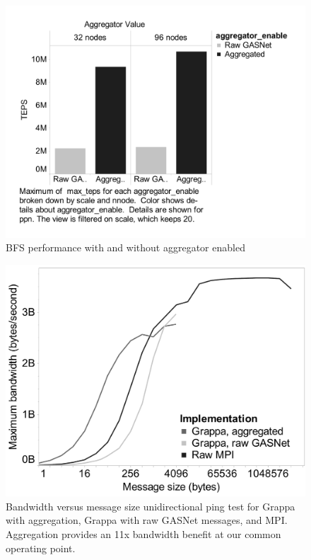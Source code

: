 \begin{figure}[htbH]
\begin{center}
  \includegraphics[width=0.95\columnwidth]{figs/bfs_aggregator_value}
\begin{minipage}{0.95\columnwidth}
  \caption{\label{fig:bfs-aggregator} BFS performance with and without aggregator enabled }
\end{minipage}
\vspace{-3ex}
\end{center}
\end{figure}




\begin{figure}[htb]
\begin{center}
  \includegraphics[width=0.95\columnwidth]{figs/aggregator_ping}
\begin{minipage}{0.95\columnwidth}
  \caption{\label{fig:aggregator-ping} Bandwidth versus message size
    unidirectional ping test for Grappa with aggregation, Grappa with
    raw GASNet messages, and MPI. Aggregation provides an 11x
    bandwidth benefit at our common operating point.}
\end{minipage}
\vspace{-3ex}
\end{center}
\end{figure}

